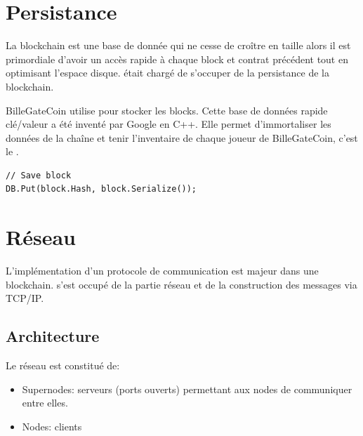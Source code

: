 \documentclass{article}
\begin{document}
\section{Persistance}
La blockchain est une base de donnée qui ne cesse de croître en taille alors il est primordiale d'avoir un accès rapide à chaque block et contrat précédent tout en optimisant l'espace disque.  était chargé de s'occuper de la persistance de la blockchain.

BilleGateCoin utilise  pour stocker les blocks. Cette base de données rapide clé/valeur a été inventé par Google en C++. Elle permet d'immortaliser les données de la chaîne et tenir l'inventaire de chaque joueur de BilleGateCoin, c'est le .

\begin{verbatim}
// Save block
DB.Put(block.Hash, block.Serialize());
\end{verbatim}

\section{Réseau}
L'implémentation d'un protocole de communication est majeur dans une blockchain.  s'est occupé de la partie réseau et de la construction des messages via TCP/IP.

\subsection{Architecture}

\begin{center}
\end{center}

Le réseau est constitué de:
\begin{itemize}
    \item Supernodes: serveurs (ports ouverts) permettant aux nodes de communiquer entre elles.
    \item Nodes: clients
\end{itemize}
\end{document}
